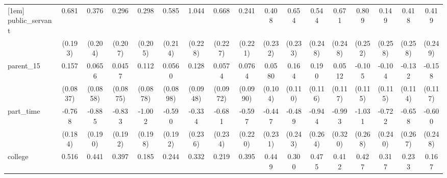 {\begin{tabular}{l*{16}{c}}
[1em]
public\_servant      &       0.681\sym{***}&       0.376         &       0.296         &       0.298         &       0.585\sym{**} &       1.044\sym{***}&       0.668\sym{**} &       0.241         &       0.408         &       0.654\sym{**} &       0.544\sym{*}  &       0.671\sym{**} &       0.809\sym{**} &       0.149         &       0.418         &       0.419         \\
                    &     (0.193)         &     (0.204)         &     (0.207)         &     (0.205)         &     (0.214)         &     (0.228)         &     (0.227)         &     (0.221)         &     (0.232)         &     (0.233)         &     (0.248)         &     (0.248)         &     (0.252)         &     (0.258)         &     (0.258)         &     (0.249)         \\
[1em]
parent\_15           &       0.157         &      0.0656         &      0.0457         &       0.112         &      0.0560         &       0.128         &      0.0574         &      0.0764         &      0.0580         &       0.164         &       0.190         &      0.0512         &      -0.105         &      -0.104         &      -0.132         &      -0.158         \\
                    &    (0.0837)         &    (0.0858)         &    (0.0875)         &    (0.0878)         &    (0.0898)         &    (0.0948)         &    (0.0972)         &    (0.0990)         &     (0.104)         &     (0.110)         &     (0.116)         &     (0.117)         &     (0.115)         &     (0.115)         &     (0.114)         &     (0.117)         \\
[1em]
part\_time           &      -0.768\sym{***}&      -0.885\sym{***}&      -0.833\sym{***}&      -1.002\sym{***}&      -0.590\sym{**} &      -0.334         &      -0.681\sym{**} &      -0.597\sym{**} &      -0.447         &      -0.489\sym{*}  &      -0.944\sym{***}&      -0.993\sym{**} &      -1.031\sym{***}&      -0.722\sym{**} &      -0.658\sym{*}  &      -0.600\sym{*}  \\
                    &     (0.184)         &     (0.190)         &     (0.192)         &     (0.198)         &     (0.192)         &     (0.236)         &     (0.234)         &     (0.220)         &     (0.231)         &     (0.243)         &     (0.264)         &     (0.320)         &     (0.268)         &     (0.240)         &     (0.267)         &     (0.248)         \\
[1em]
college             &       0.516\sym{***}&       0.441\sym{***}&       0.397\sym{***}&       0.185         &       0.244\sym{*}  &       0.332\sym{**} &       0.219         &       0.395\sym{**} &       0.449\sym{***}&       0.300\sym{*}  &       0.475\sym{**} &       0.412\sym{**} &       0.427\sym{**} &       0.317\sym{*}  &       0.233         &       0.167         \\

\end{tabular}}
